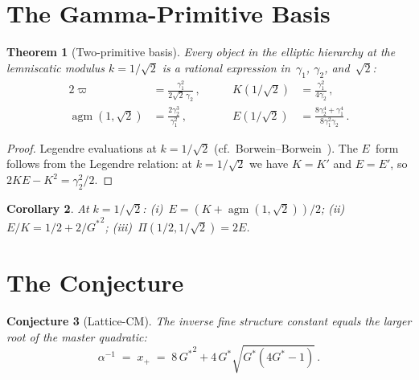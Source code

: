 \documentclass[12pt,reqno]{amsart}
\newtheorem{theorem}{Theorem}[section]
\newtheorem{corollary}[theorem]{Corollary}
\newtheorem{conjecture}[theorem]{Conjecture}
\theoremstyle{definition}
\theoremstyle{remark}
\newcommand{\Gstar}{G^{\!*}}
\newcommand{\varpiup}{\varpi}
\newcommand{\agm}{\operatorname{agm}}
\begin{document}
\section{The Gamma-Primitive Basis}\label{sec:gamma}

\begin{theorem}[Two-primitive basis]\label{thm:basis}
Every object in the elliptic hierarchy at the lemniscatic modulus
$k=1/\!\sqrt{2}$ is a rational expression in~$\gamma_{1}$, $\gamma_{2}$,
and~$\sqrt{2}$:
\begin{alignat}{2}
  \varpiup &= \frac{\gamma_{1}^{2}}{2\sqrt{2}\,\gamma_{2}}\,,
    &\qquad K(1/\!\sqrt{2}) &= \frac{\gamma_{1}^{2}}{4\gamma_{2}}\,,
    \label{eq:basis2}\\[4pt]
  \agm(1,\sqrt{2}) &= \frac{2\gamma_{2}^{3}}{\gamma_{1}^{2}}\,,
    &\qquad E(1/\!\sqrt{2})
    &= \frac{8\gamma_{2}^{4}+\gamma_{1}^{4}}{8\gamma_{1}^{2}\gamma_{2}}\,.
    \label{eq:basis3}
\end{alignat}
\end{theorem}

\begin{proof}
Legendre evaluations at $k=1/\!\sqrt{2}$
(cf.\ Borwein--Borwein~\cite{BorweinBorwein}).
The $E$~form follows from the Legendre relation: at $k=1/\!\sqrt{2}$ we have
$K=K'$ and $E=E'$, so $2KE-K^{2}=\gamma_{2}^{2}/2$.
\end{proof}

\begin{corollary}\label{cor:elliptic}
At $k=1/\!\sqrt{2}$:
\textup{(i)}~$E = (K + \agm(1,\sqrt{2}))/2$;
\textup{(ii)}~$E/K = 1/2 + 2/{{\Gstar}}^{2}$;
\textup{(iii)}~$\Pi(1/2, 1/\!\sqrt{2}) = 2E$.
\end{corollary}


\section{The Conjecture}\label{sec:physics}

\begin{conjecture}[Lattice-CM]\label{conj:lattice}
The inverse fine structure constant equals the larger root of the master
quadratic:
\[
  \alpha^{-1} \;=\; x_{+} \;=\;
  8\,{{\Gstar}}^{2} + 4\,\Gstar\sqrt{\Gstar(4\Gstar-1)}\,.
\]
\end{conjecture}
\end{document}
